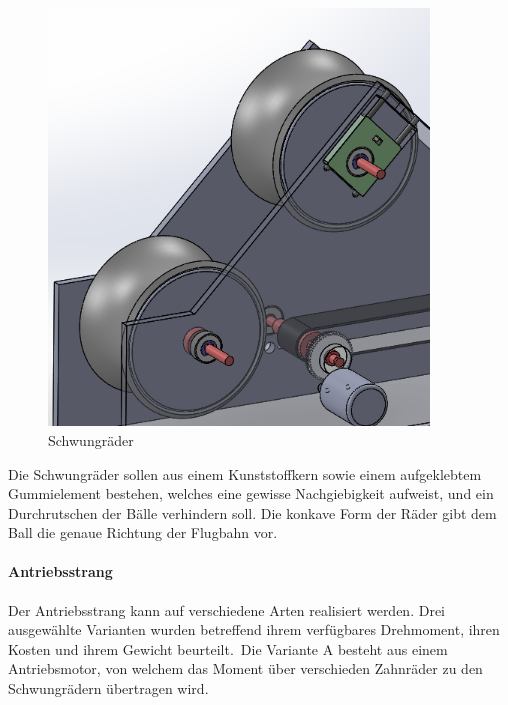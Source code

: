 \begin{figure}[h!]
	\centering
	\includegraphics[width=0.9\textwidth]{Enddokumentation/Loesungskonzept/Bilder/Schwungraeder.png}
	\caption{Schwungräder}
	\label{fig:Schwungräder}	
\end{figure}
Die Schwungräder sollen aus einem Kunststoffkern sowie einem aufgeklebtem Gummielement bestehen, welches eine gewisse Nachgiebigkeit aufweist, und ein Durchrutschen der Bälle verhindern soll.  Die konkave Form der Räder gibt dem Ball die genaue Richtung der Flugbahn vor.
\paragraph{Antriebsstrang\\}

Der Antriebsstrang kann auf verschiedene Arten realisiert werden. Drei ausgewählte Varianten wurden betreffend ihrem verfügbares Drehmoment, ihren Kosten und ihrem Gewicht beurteilt.\
Die Variante A besteht aus einem Antriebsmotor, von welchem das Moment über verschieden Zahnräder zu den Schwungrädern übertragen wird.      




